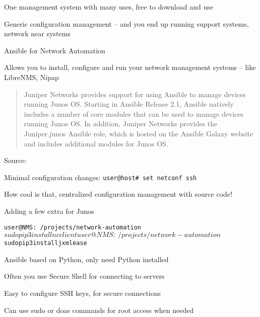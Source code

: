 \documentclass[Screen16to9,17pt]{foils}
\begin{document}
One management system with many uses, free to download and use
\begin{list2}
\item Generic configuration management -- and you end up running support systems, network near systems
\item Ansible for Network Automation\\
\item Allows you to install, configure and run your network management systems -- like LibreNMS, Nipap
\end{list2}




\begin{quote}
  Juniper Networks provides support for using Ansible to manage devices running Junos OS. Starting in Ansible Release 2.1, Ansible natively includes a number of core modules that can be used to manage devices running Junos OS. In addition, Juniper Networks provides the Juniper.junos Ansible role, which is hosted on the Ansible Galaxy website and includes additional modules for Junos OS.
\end{quote}
Source:{\footnotesize\\
}

\begin{list2}
\item Minimal configuration changes: \verb+user@host# set netconf ssh+
\end{list2}

How cool is that, centralized configuration management with source code!



Adding a few extra for Junos
\begin{alltt}\footnotesize
user@NMS:~/projects/network-automation$ sudo pip3 install ncclient
user@NMS:~/projects/network-automation$ sudo pip3 install jxmlease
\end{alltt}

\begin{list2}
\item Ansible based on Python, only need Python installed\\
\item Often you use Secure Shell for connecting to servers\\
\item Easy to configure SSH keys, for secure connections
\item Can use sudo or doas commands for root access when needed
\end{list2}
\end{document}
